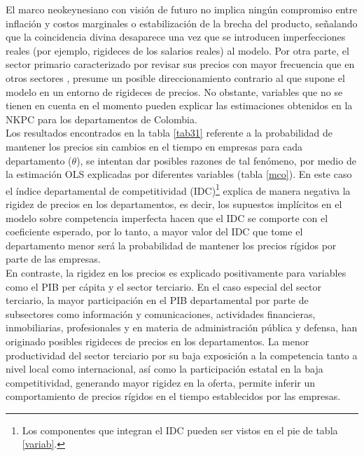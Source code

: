 El marco neokeynesiano con visión de futuro no implica ningún compromiso entre inflación y costos marginales o estabilización de la brecha del producto, señalando \cite{blanchard2007real} que la coincidencia divina desaparece una vez que se introducen imperfecciones reales (por ejemplo, rigideces de los salarios reales) al modelo. Por otra parte, el sector primario caracterizado por revisar sus precios con mayor frecuencia que en otros sectores \citep{misas2009formacion}, presume un posible direccionamiento  contrario al que supone el modelo en un entorno de rigideces de precios. No obstante, variables que no se tienen en cuenta en el momento pueden explicar las estimaciones obtenidos en la NKPC para los departamentos de Colombia.\\

Los resultados encontrados en la tabla 	\ref{tab31}  referente a la probabilidad  de mantener  los precios sin cambios en el tiempo en empresas para cada departamento ($\theta$), se intentan dar posibles razones de tal fenómeno, por medio de la estimación OLS explicadas por diferentes variables (tabla \ref{mco}). En este caso el índice departamental de competitividad (IDC)\footnote{Los componentes que integran el IDC pueden ser vistos en el pie de tabla \ref{variab}.}  explica de manera negativa la rigidez de precios en los departamentos, es decir, los supuestos implícitos en el modelo sobre competencia imperfecta hacen que el IDC  se comporte con el coeficiente esperado, por lo tanto, a mayor valor del IDC que tome el departamento menor será la probabilidad de mantener los precios rígidos por parte de las empresas.\\

En contraste, la rigidez en los precios es explicado positivamente para variables como el PIB per cápita y el sector terciario. En el caso especial del sector terciario, la mayor participación en el PIB departamental por parte de  subsectores como información y comunicaciones, actividades financieras, inmobiliarias, profesionales y en materia de administración pública y defensa, han originado posibles rigideces de precios en los departamentos. La menor productividad del sector terciario por su baja exposición a la competencia tanto a nivel local como internacional, así como la participación estatal en la baja competitividad, generando mayor rigidez en la oferta, permite inferir un comportamiento de precios rígidos en el tiempo establecidos por las empresas.\\

